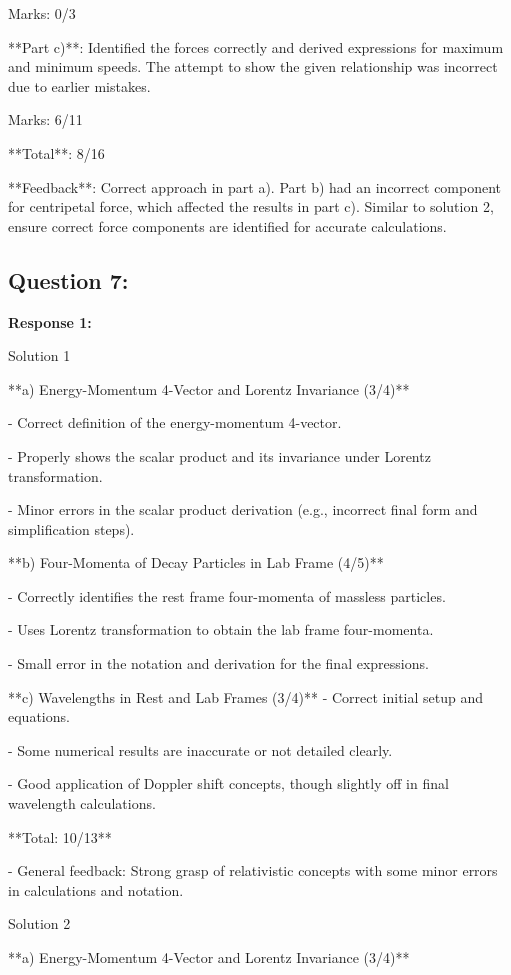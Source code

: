 \documentclass[a4paper,11pt]{article}
\begin{document}
Marks: 0/3

**Part c)**: 
Identified the forces correctly and derived expressions for maximum and minimum speeds. The attempt to show the given relationship was incorrect due to earlier mistakes.

Marks: 6/11

**Total**: 8/16

**Feedback**: Correct approach in part a). Part b) had an incorrect component for centripetal force, which affected the results in part c). Similar to solution 2, ensure correct force components are identified for accurate calculations.


\subsection*{Question 7:}

\textbf{Response 1:}

Solution 1

**a) Energy-Momentum 4-Vector and Lorentz Invariance (3/4)**

- Correct definition of the energy-momentum 4-vector.

- Properly shows the scalar product and its invariance under Lorentz transformation.

- Minor errors in the scalar product derivation (e.g., incorrect final form and simplification steps).

**b) Four-Momenta of Decay Particles in Lab Frame (4/5)**

- Correctly identifies the rest frame four-momenta of massless particles.

- Uses Lorentz transformation to obtain the lab frame four-momenta.

- Small error in the notation and derivation for the final expressions.

**c) Wavelengths in Rest and Lab Frames (3/4)**
- Correct initial setup and equations.

- Some numerical results are inaccurate or not detailed clearly.

- Good application of Doppler shift concepts, though slightly off in final wavelength calculations.

**Total: 10/13**

- General feedback: Strong grasp of relativistic concepts with some minor errors in calculations and notation.

Solution 2

**a) Energy-Momentum 4-Vector and Lorentz Invariance (3/4)**
\end{document}

